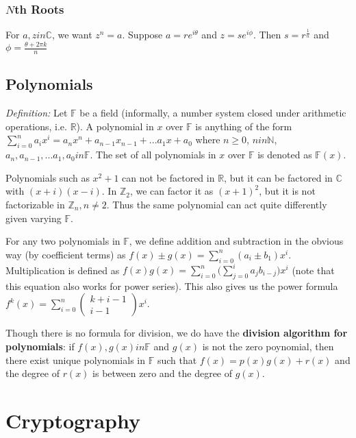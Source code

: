 \documentclass[12pt]{article}
\begin{document}
\subsubsection*{$N$th Roots}
For $a,z in \mathbb{C}$, we want $z^n = a$. Suppose $a = re^{i\theta}$ and $z = se^{i\phi}$. Then $s = r^\frac{1}{n}$ and $\phi = \frac{\theta + 2\pi k}{n}$

\subsection*{Polynomials}
\textit{Definition: } Let $\mathbb{F}$ be a field (informally, a number system closed under arithmetic operations, i.e. $\mathbb{R}$). A polynomial in $x$ over $\mathbb{F}$ is anything of the form $\displaystyle\sum_{i = 0}^n a_ix^i = a_nx^n + a_{n-1}x_{n-1} + ... a_1x + a_0$ where $n \geq 0$, $n in \mathbb{N}$, $a_n, a_{n-1}, ... a_1, a_0 in \mathbb{F}$. The set of all polynomials in $x$ over $\mathbb{F}$ is denoted as $\mathbb{F}(x)$.

Polynomials such as $x^2 + 1$ can not be factored in $\mathbb{R}$, but it can be factored in $\mathbb{C}$ with $(x + i)(x - i)$. In $\mathbb{Z}_2$, we can factor it as $(x + 1)^2$, but it is not factorizable in $\mathbb{Z}_n, n \neq 2$. Thus the same polynomial can act quite differently given varying $\mathbb{F}$.

For any two polynomials in $\mathbb{F}$, we define addition and subtraction in the obvious way (by coefficient terms) as $f(x) \pm g(x) = \displaystyle\sum_{i = 0}^n (a_i \pm b_1) x^i$. Multiplication is defined as $f(x)g(x) = \displaystyle\sum_{i = 0}^n \bigg( \sum_{j = 0}^i a_j b_{i-j} \bigg) x^i$ (note that this equation also works for power series). This also gives us the power formula $f^k(x) = \displaystyle\sum_{i = 0}^n \begin{pmatrix}k + i - 1 \\ i - 1\end{pmatrix} x^i$.

Though there is no formula for division, we do have the {\bf division algorithm for polynomials}: if $f(x), g(x) in \mathbb{F}$ and $g(x)$ is not the zero poynomial, then there exist unique polynomials in $\mathbb{F}$ such that $f(x) = p(x)g(x) + r(x)$ and the degree of $r(x)$ is between zero and the degree of $g(x)$.

\section*{Cryptography}
\end{document}
